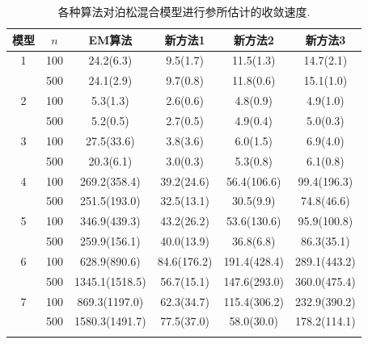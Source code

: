 \documentclass[a4paper,12pt,openany,oneside,utf-8]{ctexbook}
\newcommand{\wuhao}{\fontsize{10.5pt}{\baselineskip}\selectfont}
\begin{document}
\begin{table}[b!] %
\wuhao
\centering
{}   %
\caption{各种算法对泊松混合模型进行参所估计的收敛速度.}
\label{tab:Algorithm convergence in simulation studies for Poisson mixture models}
\medskip
\begin{tabular}{c c cccc}
\Xhline{1.0pt}
模型 & $n$ & EM算法 & 新方法1 & 新方法2 & 新方法3 \\
\hline
1 & 100 & 24.2(6.3) & 9.5(1.7) & 11.5(1.3) & 14.7(2.1) \\
 & 500 & 24.1(2.9) & 9.7(0.8) & 11.8(0.6) & 15.1(1.0) \\
2 & 100 & 5.3(1.3) & 2.6(0.6) & 4.8(0.9) & 4.9(1.0) \\
 & 500 & 5.2(0.5) & 2.7(0.5) & 4.9(0.4) & 5.0(0.3) \\
3 & 100 & 27.5(33.6) & 3.8(3.6) & 6.0(1.5) & 6.9(4.0) \\
 & 500 & 20.3(6.1) & 3.0(0.3) & 5.3(0.8) & 6.1(0.8) \\
4 & 100 & 269.2(358.4) & 39.2(24.6) & 56.4(106.6) & 99.4(196.3) \\
 & 500 & 251.5(193.0) & 32.5(13.1) & 30.5(9.9) & 74.8(46.6) \\
5 & 100 & 346.9(439.3) & 43.2(26.2) & 53.6(130.6) & 95.9(100.8) \\
 & 500 & 259.9(156.1) & 40.0(13.9) & 36.8(6.8) & 86.3(35.1) \\
6 & 100 & 628.9(890.6) & 84.6(176.2) & 191.4(428.4) & 289.1(443.2) \\
 & 500 & 1345.1(1518.5) & 56.7(15.1) & 147.6(293.0) & 360.0(475.4) \\
7 & 100 & 869.3(1197.0) & 62.3(34.7) & 115.4(306.2) & 232.9(390.2) \\
 & 500 & 1580.3(1491.7) & 77.5(37.0) & 58.0(30.0) & 178.2(114.1) \\
\Xhline{1.0pt}
\end{tabular}
\end{table}
\end{document}
